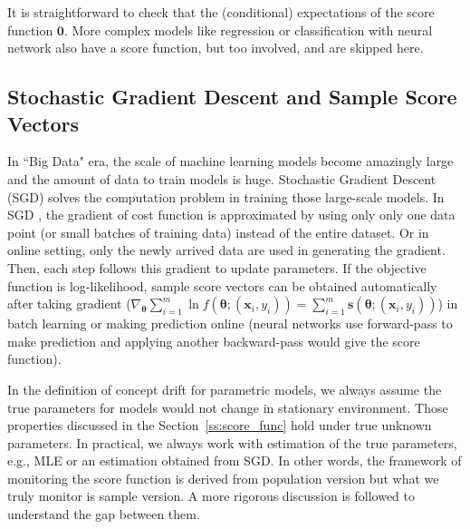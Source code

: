 \documentclass[twoside,11pt]{article}
\begin{document}
It is straightforward to check that the (conditional) expectations of  the score function  $\bm {0}$. More complex models like regression or classification with neural network also have a score function, but too involved, and are skipped here. 

\subsection{Stochastic Gradient Descent and Sample Score Vectors}
\label{ss:sgd_score}
%

In ``Big Data" era, the scale of machine learning models become amazingly large and the amount of  data to train models is huge. Stochastic Gradient Descent (SGD)  solves the computation problem in training those large-scale models. In SGD , the gradient of cost function is approximated by using only only one data point (or small batches of training data) instead of the entire dataset. Or in online setting, only the newly arrived data are used in generating the gradient. Then, each step follows this gradient to update parameters. If the objective function is log-likelihood, sample score vectors can be obtained automatically after taking gradient ($\nabla _{\bm { \theta}} \sum _{i=1} ^{m} \ln f(\bm{\theta}; (\bm {x}_i, y_i)) = \sum _{i=1} ^{m} \bm{s}(\bm { \theta};(\bm {x}_i, y_i))$) in batch learning or making prediction online (neural networks use forward-pass to make prediction and applying another backward-pass would give the score function). 

In the definition of concept drift for parametric models, we always assume the true parameters for models would not change in stationary environment. Those properties discussed in the Section~\ref{ss:score_func} hold under true unknown parameters. In practical, we always work with estimation of the true parameters, e.g., MLE or an estimation obtained from SGD. In other words, the framework of monitoring the score function is derived from population version but what we truly monitor is sample version. A more rigorous discussion is followed to understand the gap between them.
\end{document}
